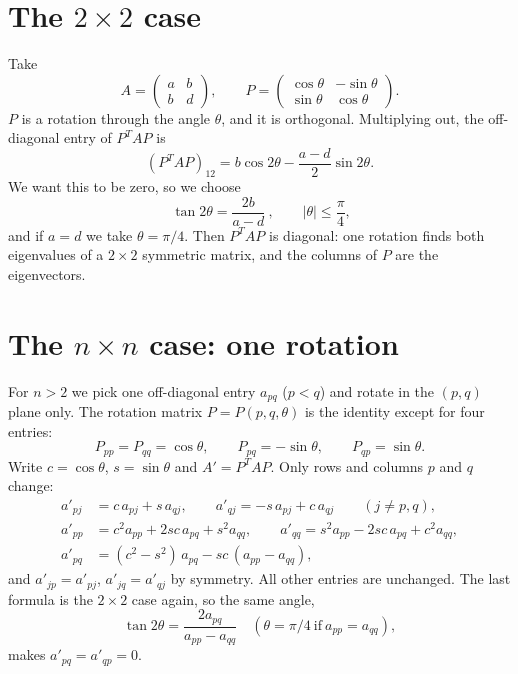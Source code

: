 \documentclass[11pt,a4paper]{article}
\theoremstyle{definition}
\theoremstyle{remark}
\begin{document}
\section{The $2\times2$ case}
Take
\[
A=\begin{pmatrix}a&b\\b&d\end{pmatrix},\qquad
P=\begin{pmatrix}\cos\theta&-\sin\theta\\ \sin\theta&\cos\theta\end{pmatrix}.
\]
$P$ is a rotation through the angle $\theta$, and it is orthogonal. Multiplying out,
the off-diagonal entry of $P^TAP$ is
\[
(P^TAP)_{12}=b\cos2\theta-\frac{a-d}{2}\sin2\theta .
\]
We want this to be zero, so we choose
\[
\boxed{\ \tan2\theta=\frac{2b}{a-d}\ },\qquad |\theta|\le\frac{\pi}{4},
\]
and if $a=d$ we take $\theta=\pi/4$. Then $P^TAP$ is diagonal: one rotation finds both eigenvalues of a
$2\times2$ symmetric matrix, and the columns of $P$ are the eigenvectors.

\section{The $n\times n$ case: one rotation}
For $n>2$ we pick one off-diagonal entry $a_{pq}$ ($p<q$) and rotate in the $(p,q)$ plane only.
The rotation matrix $P=P(p,q,\theta)$ is the identity except for four entries:
\[
P_{pp}=P_{qq}=\cos\theta,\qquad P_{pq}=-\sin\theta,\qquad P_{qp}=\sin\theta .
\]
Write $c=\cos\theta$, $s=\sin\theta$ and $A'=P^TAP$. Only rows and columns $p$ and $q$ change:
\begin{align*}
a'_{pj}&=c\,a_{pj}+s\,a_{qj},\qquad a'_{qj}=-s\,a_{pj}+c\,a_{qj}\qquad(j\ne p,q),\\
a'_{pp}&=c^2a_{pp}+2sc\,a_{pq}+s^2a_{qq},\qquad
a'_{qq}=s^2a_{pp}-2sc\,a_{pq}+c^2a_{qq},\\
a'_{pq}&=(c^2-s^2)\,a_{pq}-sc\,(a_{pp}-a_{qq}),
\end{align*}
and $a'_{jp}=a'_{pj}$, $a'_{jq}=a'_{qj}$ by symmetry. All other entries are unchanged.
The last formula is the $2\times2$ case again, so the same angle,
\[
\tan2\theta=\frac{2a_{pq}}{a_{pp}-a_{qq}}\quad(\theta=\pi/4\ \text{if}\ a_{pp}=a_{qq}),
\]
makes $a'_{pq}=a'_{qp}=0$.
\end{document}
